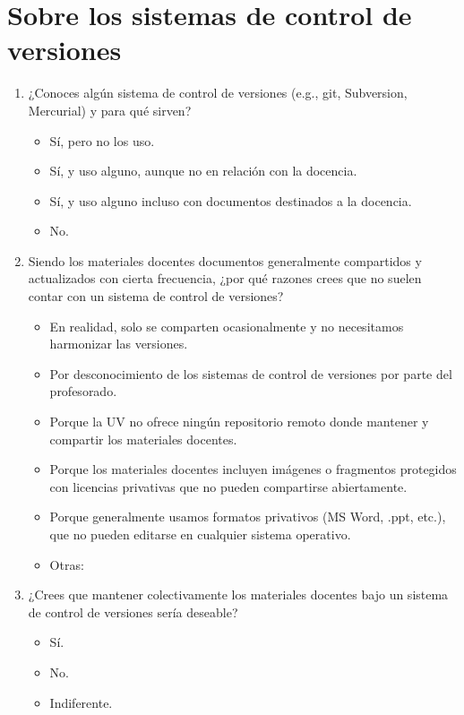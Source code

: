 \documentclass[a4paper,12pt]{article}
\newcounter{preg}[section]
\begin{document}
\section{Sobre los sistemas de control de versiones}
\begin{enumerate}
\item {} ¿Conoces algún sistema de control de versiones (e.g., \textsf{git}, Subversion, Mercurial) y
      para qué sirven?
   \begin{itemize}
   \item Sí, pero no los uso.
   \item Sí, y uso alguno, aunque no en relación con la docencia.
   \item Sí, y uso alguno incluso con documentos destinados a la docencia.
   \item No.
   \end{itemize}

\item {} Siendo los materiales docentes documentos generalmente compartidos y actualizados con cierta
      frecuencia, ¿por qué razones crees que no suelen contar con un sistema de control de versiones?
   \begin{itemize}
   \item En realidad, solo se comparten ocasionalmente y no necesitamos harmonizar las versiones.
   \item Por desconocimiento de los sistemas de control de versiones por parte del profesorado.
   \item Porque la UV no ofrece ningún repositorio remoto donde mantener y compartir los materiales
         docentes.
   \item Porque los materiales docentes incluyen imágenes o fragmentos protegidos con licencias
         privativas que no pueden compartirse abiertamente.
   \item Porque generalmente usamos formatos privativos (MS Word, .ppt, etc.), que no pueden
         editarse en cualquier sistema operativo.
   \item Otras:
   \vspace*{1cm}
   \end{itemize}

\item {} ¿Crees que mantener colectivamente los materiales docentes bajo un sistema de control de
      versiones sería deseable?
   \begin{itemize}
   \item Sí.
   \item No.
   \item Indiferente.
   \end{itemize}


\end{enumerate}
\end{document}

